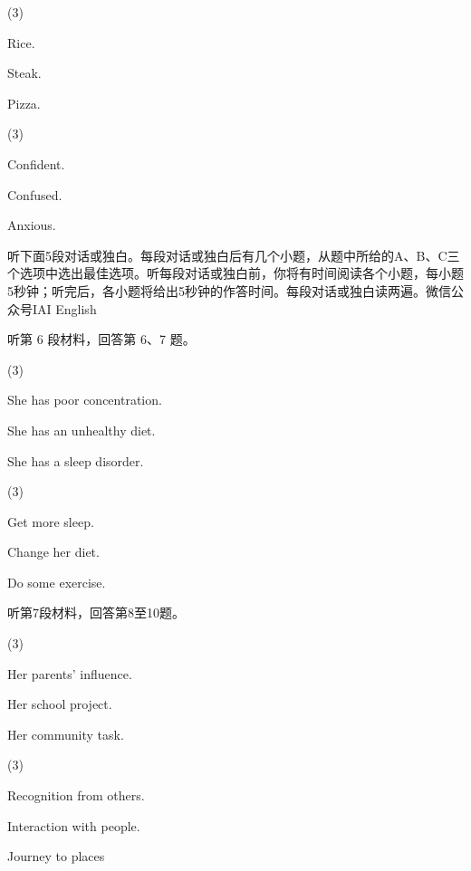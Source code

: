 \documentclass{英语试卷}
\begin{document}
\begin{choices}(3)
  \item Rice.
  \item Steak.
  \item Pizza.
\end{choices}
\begin{choices}(3)
  \item Confident.
  \item Confused.
  \item Anxious.
\end{choices}
\par 听下面5段对话或独白。每段对话或独白后有几个小题，从题中所给的A、B、C三个选项中选出最佳选项。听每段对话或独白前，你将有时间阅读各个小题，每小题5秒钟；听完后，各小题将给出5秒钟的作答时间。每段对话或独白读两遍。微信公众号IAI English\par
\par 听第 6 段材料，回答第 6、7 题。\par
{}
\begin{choices}(3)
  \item She has poor concentration.
  \item She has an unhealthy diet.
  \item She has a sleep disorder.
\end{choices}
\begin{choices}(3)
  \item Get more sleep.
  \item Change her diet.
  \item Do some exercise.
\end{choices}
\par 听第7段材料，回答第8至10题。\par
{}
\begin{choices}(3)
  \item Her parents' influence.
  \item Her school project.
  \item Her community task.
\end{choices}
\begin{choices}(3)
  \item Recognition from others.
  \item Interaction with people.
  \item Journey to places
\end{choices}
\end{document}
